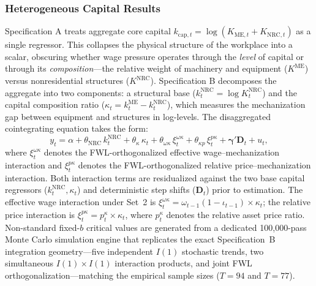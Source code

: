 \subsubsection{Heterogeneous Capital Results}
\label{sec:432:specB_results}

Specification A treats aggregate core capital $k_{\text{cap},t} = \log(K_{\text{ME},t} + K_{\text{NRC},t})$ as a single regressor. This collapses the physical structure of the workplace into a scalar, obscuring whether wage pressure operates through the \emph{level} of capital or through its \emph{composition}---the relative weight of machinery and equipment ($K^{\text{ME}}$) versus nonresidential structures ($K^{\text{NRC}}$). Specification B decomposes the aggregate into two components: a structural base ($k^{\text{NRC}}_t = \log K^{\text{NRC}}_t$) and the capital composition ratio ($\kappa_t = k^{\text{ME}}_t - k^{\text{NRC}}_t$), which measures the mechanization gap between equipment and structures in log-levels. The disaggregated cointegrating equation takes the form:
\begin{equation}
	y_t = \alpha + \theta_{\text{NRC}}\, k^{\text{NRC}}_t + \theta_\kappa\, \kappa_t + \theta_{\omega\kappa}\, \xi^{\omega\kappa}_t + \theta_{\kappa p}\, \xi^{p\kappa}_t + \boldsymbol{\gamma}' \mathbf{D}_t + u_t,
	\label{eq:432:specB_model}
\end{equation}
where $\xi^{\omega\kappa}_t$ denotes the FWL-orthogonalized effective wage--mechanization interaction and $\xi^{p\kappa}_t$ denotes the FWL-orthogonalized relative price--mechanization interaction. Both interaction terms are residualized against the two base capital regressors ($k^{\text{NRC}}_t, \kappa_t$) and deterministic step shifts ($\mathbf{D}_t$) prior to estimation. The effective wage interaction under Set~2 is $\xi^{\omega\kappa}_t = \omega_{t-1}(1-\iota_{t-1}) \times \kappa_t$; the relative price interaction is $\xi^{p\kappa}_t = p^{\kappa}_t \times \kappa_t$, where $p^{\kappa}_t$ denotes the relative asset price ratio. Non-standard fixed-$b$ critical values are generated from a dedicated 100,000-pass Monte Carlo simulation engine that replicates the exact Specification~B integration geometry---five independent $I(1)$ stochastic trends, two simultaneous $I(1) \times I(1)$ interaction products, and joint FWL orthogonalization---matching the empirical sample sizes ($T = 94$ and $T = 77$).


